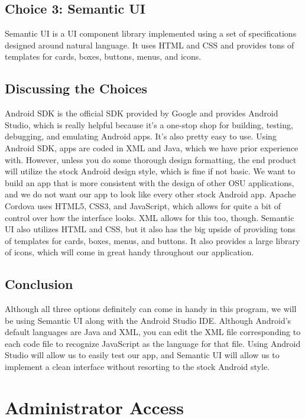 \documentclass[draftclsnofoot, onecolumn, 10pt, compsoc]{IEEEtran}
\begin{document}
		\subsection{Choice 3: Semantic UI}
			Semantic UI is a UI component library implemented using a set of specifications designed around natural language. It uses HTML and CSS and provides tons of templates for cards, boxes, buttons, menus, and icons. 
			~\cite{Semantic_UI}
		
		\subsection{Discussing the Choices}
			Android SDK is the official SDK provided by Google and provides Android Studio, which is really helpful because it's a one-stop shop for building, testing, debugging, and emulating Android apps. It's also pretty easy to use. Using Android SDK, apps are coded in XML and Java, which we have prior experience with. However, unless you do some thorough design formatting, the end product will utilize the stock Android design style, which is fine if not basic. We want to build an app that is more consistent with the design of other OSU applications, and we do not want our app to look like every other stock Android app. Apache Cordova uses HTML5, CSS3, and JavaScript, which allows for quite a bit of control over how the interface looks. XML allows for this too, though. Semantic UI also utilizes HTML and CSS, but it also has the big upside of providing tons of templates for cards, boxes, menus, and buttons. It also provides a large library of icons, which will come in great handy throughout our application.
		
		\subsection{Conclusion}
			Although all three options definitely can come in handy in this program, we will be using Semantic UI along with the Android Studio IDE. Although Android's default languages are Java and XML, you can edit the XML file corresponding to each code file to recognize JavaScript as the language for that file. Using Android Studio will allow us to easily test our app, and Semantic UI will allow us to implement a clean interface without resorting to the stock Android style.
			~\cite{SemanticUI_JS}
		
	\section{Administrator Access}
\end{document}
